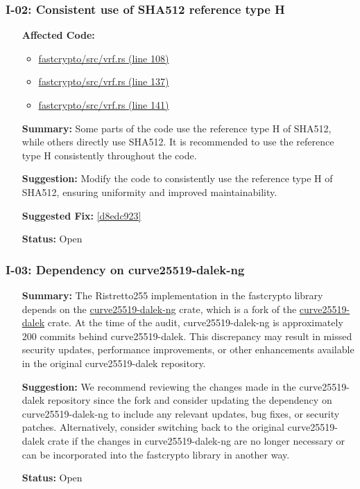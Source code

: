 \subsubsection*{I-02: Consistent use of SHA512 reference type H}
\begin{itemize}[align=left]
\item[\textbf{Affected Code:}]\
\begin{itemize}
\item \href{https://github.com/MystenLabs/fastcrypto/blob/963205c6d0538fe548b8b10037cf87a53af6f424/fastcrypto/src/vrf.rs#L108}{fastcrypto/src/vrf.rs (line 108)}
\item \href{https://github.com/MystenLabs/fastcrypto/blob/963205c6d0538fe548b8b10037cf87a53af6f424/fastcrypto/src/vrf.rs#L137}{fastcrypto/src/vrf.rs (line 137)}
\item \href{https://github.com/MystenLabs/fastcrypto/blob/963205c6d0538fe548b8b10037cf87a53af6f424/fastcrypto/src/vrf.rs#L141}{fastcrypto/src/vrf.rs (line 141)}
\end{itemize}
\item[\textbf{Summary:}] Some parts of the code use the reference type H of SHA512, while others directly use SHA512. It is recommended to use the reference type H consistently throughout the code.
\item[\textbf{Suggestion:}] Modify the code to consistently use the reference type H of SHA512, ensuring uniformity and improved maintainability.
\item[\textbf{Suggested Fix:}] \href{https://github.com/MystenLabs/fastcrypto/pull/543/commits/d8edc92340dd957f4bd05c356379be7ffa0916a5}{[d8edc923]}
\item[\textbf{Status:}] Open
\end{itemize}

\subsubsection*{I-03: Dependency on curve25519-dalek-ng}
\begin{itemize}[align=left]
    \item[\textbf{Summary:}] The Ristretto255 implementation in the fastcrypto library depends on the \href{https://github.com/zkcrypto/curve25519-dalek-ng}{curve25519-dalek-ng} crate, which is a fork of the \href{https://github.com/dalek-cryptography/curve25519-dalek}{curve25519-dalek} crate. At the time of the audit, curve25519-dalek-ng is approximately 200 commits behind curve25519-dalek. This discrepancy may result in missed security updates, performance improvements, or other enhancements available in the original curve25519-dalek repository.
    \item[\textbf{Suggestion:}] We recommend reviewing the changes made in the curve25519-dalek repository since the fork and consider updating the dependency on curve25519-dalek-ng to include any relevant updates, bug fixes, or security patches. Alternatively, consider switching back to the original curve25519-dalek crate if the changes in curve25519-dalek-ng are no longer necessary or can be incorporated into the fastcrypto library in another way.
    \item[\textbf{Status:}] Open
\end{itemize}


